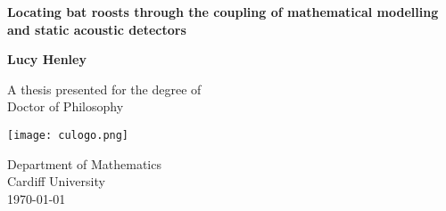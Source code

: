 \begin{titlingpage}
\begin{center}
    \vspace*{1cm}

    \huge
    \textbf{Locating bat roosts through the coupling of mathematical
modelling and static acoustic detectors}

    \vspace{0.5cm}
    \LARGE

    \vspace{1.5cm}

    \textbf{Lucy Henley}

    \vfill

    A thesis presented for the degree of\\
    Doctor of Philosophy

    \vspace{0.8cm}

    \texttt{[image: culogo.png]}

    \Large
    Department of Mathematics\\
    Cardiff University\\
    \today

\end{center}
\end{titlingpage}
